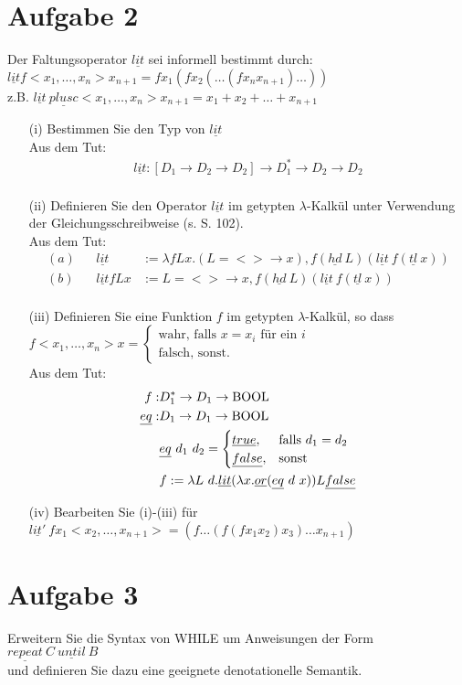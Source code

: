\documentclass[ngerman,a4paper]{report}
\begin{document}
\section*{Aufgabe 2}
Der Faltungsoperator $\underline{lit}$ sei informell bestimmt durch:
$\underline{lit} f<x_1,\dots,x_n>x_{n+1} = fx_1(fx_2(\dots(fx_n x_{n+1})\dots))$\\
z.B. $\underline{lit} \ \underline{plusc}<x_1,\dots,x_n>x_{n+1} = x_1 + x_2 + \dots + x_{n+1}$\\
\begin{itemize}
\item[(i)] Bestimmen Sie den Typ von $\underline{lit}$\\
Aus dem Tut:
\begin{align*}
\underline{lit}: [D_1 \rightarrow D_2 \rightarrow D_2] \rightarrow D_1^* \rightarrow D_2 \rightarrow D_2\\
\end{align*}
\item[(ii)] Definieren Sie den Operator $\underline{lit}$ im getypten $\lambda$-Kalkül unter Verwendung der Gleichungsschreibweise (s. S. 102).\\
Aus dem Tut:
\begin{align*}
	(a)&& \underline{lit} &:= \lambda	 f L x. (L = <> \rightarrow x), f (\underline{hd}\ L) (\underline{lit}\ f(\underline{tl}\ x))\\
	(b)&& \underline{lit}	 f L x &:= L = <> \rightarrow x, f (\underline{hd}\ L) (\underline{lit}\ f(\underline{tl}\ x))\\
\end{align*}
\item[(iii)] Definieren Sie eine Funktion $f$ im getypten $\lambda$-Kalkül, so dass\\
$
f<x_1,\dots,x_n>x=\begin{cases}
\text{wahr, falls } x=x_i \text{ für ein } i\\
\text{falsch, sonst.}
\end{cases}
$\\
Aus dem Tut:
\begin{align*}
	f :& D_1^* \rightarrow D_1 \rightarrow \text{\lstinline!BOOL!}\\
	\underline{eq} :& D_1 \rightarrow D_1 \rightarrow \text{\lstinline!BOOL!}\\
				 &\underline{eq}\ d_1 \ d_2 = \begin{cases} \underline{true}, &\text{falls } d_1 = d_2 \\ \underline{false}, &\text{sonst}
\end{cases}\\
&f := \lambda L\ d.\underline{lit}(\lambda x. \underline{or} (\underline{eq}\ d\ x)) L \underline{false}\\
\end{align*}
\item[(iv)] Bearbeiten Sie (i)-(iii) für $\underline{lit'}\ fx_1<x_2,\dots,x_{n+1}>=(f\dots(f(fx_1 x_2)x_3)\dots x_{n+1})$
\end{itemize}

\section*{Aufgabe 3}
Erweitern Sie die Syntax von WHILE um Anweisungen der Form\\
$\underline{repeat}\ C\ \underline{until}\ B$\\
und definieren Sie dazu eine geeignete denotationelle Semantik.
\end{document}

